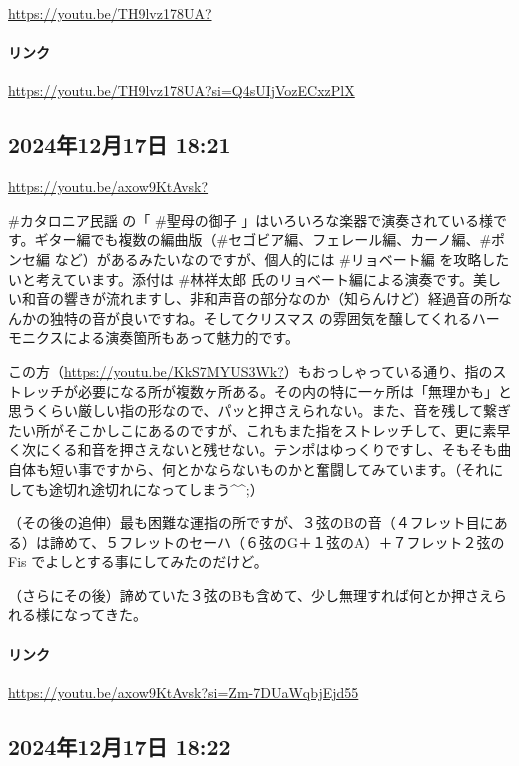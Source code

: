 \url{https://youtu.be/TH9lvz178UA?}

\paragraph{リンク}
\url{https://youtu.be/TH9lvz178UA?si=Q4sUIjVozECxzPlX}

\subsection*{2024年12月17日 18:21}

\url{https://youtu.be/axow9KtAvsk?}

\#カタロニア民謡 の「 \#聖母の御子 」はいろいろな楽器で演奏されている様です。ギター編でも複数の編曲版（\#セゴビア編、フェレール編、カーノ編、\#ポンセ編 など）があるみたいなのですが、個人的には \#リョベート編 を攻略したいと考えています。添付は \#林祥太郎 氏のリョベート編による演奏です。美しい和音の響きが流れますし、非和声音の部分なのか（知らんけど）経過音の所なんかの独特の音が良いですね。そしてクリスマス🎄の雰囲気を醸してくれるハーモニクスによる演奏箇所もあって魅力的です。

この方（\url{https://youtu.be/KkS7MYUS3Wk?}）もおっしゃっている通り、指のストレッチが必要になる所が複数ヶ所ある。その内の特に一ヶ所は「無理かも」と思うくらい厳しい指の形なので、パッと押さえられない。また、音を残して繋ぎたい所がそこかしこにあるのですが、これもまた指をストレッチして、更に素早く次にくる和音を押さえないと残せない。テンポはゆっくりですし、そもそも曲自体も短い事ですから、何とかならないものかと奮闘してみています。（それにしても途切れ途切れになってしまう\textasciicircum{}\textasciicircum{};）

（その後の追伸）最も困難な運指の所ですが、３弦のBの音（４フレット目にある）は諦めて、５フレットのセーハ（６弦のG＋１弦のA）＋７フレット２弦のFis でよしとする事にしてみたのだけど。

（さらにその後）諦めていた３弦のBも含めて、少し無理すれば何とか押さえられる様になってきた。

\paragraph{リンク}
\url{https://youtu.be/axow9KtAvsk?si=Zm-7DUaWqbjEjd55}

\subsection*{2024年12月17日 18:22}

